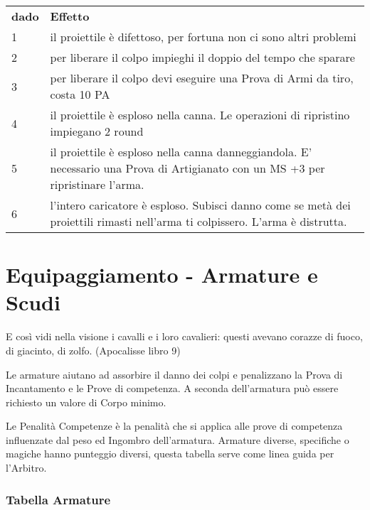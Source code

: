 \documentclass[12pt,a4paper,twoside,openany]{book}
\begin{document}
\begin{tabularx}{0.95\textwidth}{lX}
\toprule
\textbf{dado}& \textbf{Effetto}\\
1	&  il proiettile è difettoso, per fortuna non ci sono altri problemi \\
2	&  per liberare il colpo impieghi il doppio del tempo che sparare\\
3	& per liberare il colpo devi eseguire una Prova di Armi da tiro, costa 10 PA\\
4	& il proiettile è esploso nella canna. Le operazioni di ripristino impiegano 2 round\\
5	& il proiettile è esploso nella canna danneggiandola. E' necessario una Prova di Artigianato con un MS +3 per ripristinare l'arma.\\
6 	& l'intero caricatore è esploso. Subisci danno come se metà dei proiettili rimasti nell'arma ti colpissero. L'arma è distrutta.\\

\end{tabularx}


\pagebreak

\section{Equipaggiamento - Armature e Scudi} \hypertarget{equipaggiamento.armature.scudi}{}\label{equipaggiamentoarmature}

\label{equipaggiamento---armature-e-scudi}

\begin{changemargin}{0.3cm}{0.3cm}\begin{enfasi}{
E così vidi nella visione i cavalli e i loro cavalieri: questi avevano corazze di fuoco, di giacinto, di zolfo. (Apocalisse libro 9)} \end{enfasi}\end{changemargin}\medskip

Le armature aiutano ad assorbire il danno dei colpi e penalizzano la Prova di Incantamento e le Prove di competenza. A seconda dell'armatura può essere richiesto un valore di Corpo minimo.

Le Penalità Competenze è la penalità che si applica alle prove di competenza influenzate dal peso ed Ingombro dell'armatura. Armature diverse, specifiche o magiche hanno punteggio diversi, questa tabella serve come linea guida per l'Arbitro.

\subsubsection{Tabella Armature}
\end{document}
